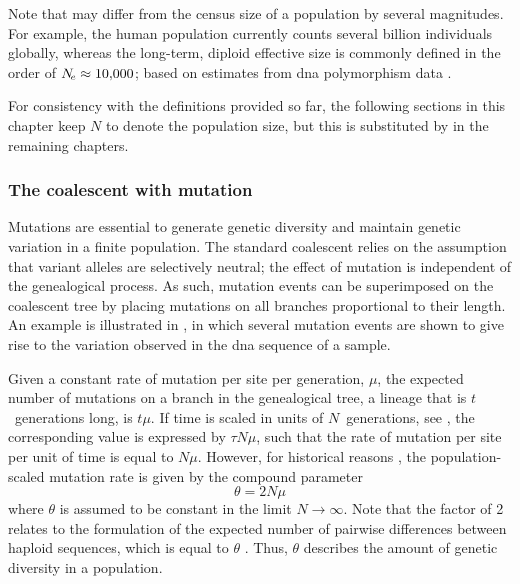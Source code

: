 Note that \Ne may differ from the census size of a population by several magnitudes.
For example, the human population currently counts several billion individuals globally, whereas the long-term, diploid effective size is commonly defined in the order of ${N_{\!e} \approx \num{10000}}$; \eg based on estimates from \gls{dna} polymorphism data \citep[\eg][]{Takahata:1993ko,Yu:2001wl}.

For consistency with the definitions provided so far, the following sections in this chapter keep $N$ to denote the population size, but this is substituted by \Ne in the remaining chapters.




%
\subsubsection{The coalescent with mutation}
\label{sec:coal_mutation}
%

Mutations are essential to generate genetic diversity and maintain genetic variation in a finite population.
The standard coalescent relies on the assumption that variant alleles are selectively neutral; \ie the effect of mutation is independent of the genealogical process.
As such, mutation events can be superimposed on the coalescent tree by placing mutations on all branches proportional to their length.
An example is illustrated in , in which several mutation events are shown to give rise to the variation observed in the \gls{dna} sequence of a sample.

%

%

Given a constant rate of mutation per site per generation, $\mu$, the expected number of mutations on a branch in the genealogical tree, \ie a lineage that is $t$~generations long, is ${t\mu}$.
If time is scaled in units of $N$~generations, see , the corresponding value is expressed by ${\tau N \mu}$, such that the rate of mutation per site per unit of time is equal to ${N \mu}$.
However, for historical reasons \citep[\eg, see][]{wakeley2008}, the population-scaled mutation rate is given by the compound parameter
\begin{equation}\label{eq:mutrate}
	\theta = 2 N \mu
\end{equation}
where $\theta$ is assumed to be constant in the limit ${N\rightarrow\infty}$.
Note that the factor of 2 relates to the formulation of the expected number of pairwise differences between  haploid sequences, which is equal to $\theta$ \citep{tajima1993}.
Thus, $\theta$ describes the amount of genetic diversity in a population.

